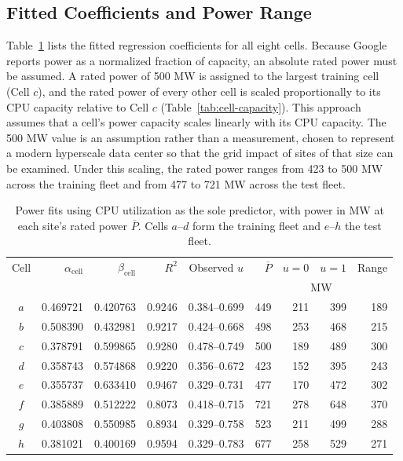 \documentclass{UNCC-thesis}
\begin{document}
\subsection{Fitted Coefficients and Power Range}
\label{subsec:powerdata-coefficients}

Table~\ref{tab:powerdata-coefficients} lists the fitted regression coefficients
for all eight cells. Because Google reports power as a normalized fraction of
capacity, an absolute rated power must be assumed. A rated power of 500 MW is assigned to
the largest training cell (Cell \(c\)), and the rated power of every other cell is scaled
proportionally to its CPU capacity relative to Cell \(c\) (Table~\ref{tab:cell-capacity}).
This approach assumes that a cell's power
capacity scales linearly with its CPU capacity. The 500 MW value is an assumption
rather than a measurement, chosen to represent a modern hyperscale data center so
that the grid impact of sites of that size can be examined. Under this scaling, the rated
power ranges from 423 to 500 MW across the training fleet and from 477 to 721 MW
across the test fleet.

\begin{table}[htbp]
  \centering
  \footnotesize
  \caption[Power fits of the eight cells]{Power fits using CPU utilization as the sole predictor, with
  power in MW at each site's rated power \(\overline P\). Cells
  \(a\)--\(d\) form the training fleet and \(e\)--\(h\) the test fleet.}
  \label{tab:powerdata-coefficients}
  \begin{tabular}{@{}crrrcrrrr@{}}
    \toprule
    Cell & \(\alpha_{\mathrm{cell}}\) & \(\beta_{\mathrm{cell}}\) & \(R^2\) & Observed \(u\)
         & \(\overline P\) & \(u=0\) & \(u=1\) & Range \\
         & & & & & \multicolumn{4}{c}{MW} \\
    \midrule
    \(a\) & 0.469721 & 0.420763 & 0.9246 & 0.384--0.699
          & 449 & 211 & 399 & 189 \\
    \(b\) & 0.508390 & 0.432981 & 0.9217 & 0.424--0.668
          & 498 & 253 & 468 & 215 \\
    \(c\) & 0.378791 & 0.599865 & 0.9280 & 0.478--0.749
          & 500 & 189 & 489 & 300 \\
    \(d\) & 0.358743 & 0.574868 & 0.9220 & 0.356--0.672
          & 423 & 152 & 395 & 243 \\
    \addlinespace
    \(e\) & 0.355737 & 0.633410 & 0.9467 & 0.329--0.731
          & 477 & 170 & 472 & 302 \\
    \(f\) & 0.385889 & 0.512222 & 0.8073 & 0.418--0.715
          & 721 & 278 & 648 & 370 \\
    \(g\) & 0.403808 & 0.550985 & 0.8934 & 0.329--0.758
          & 523 & 211 & 499 & 288 \\
    \(h\) & 0.381021 & 0.400169 & 0.9594 & 0.329--0.783
          & 677 & 258 & 529 & 271 \\
    \bottomrule
  \end{tabular}
\end{table}
\end{document}
